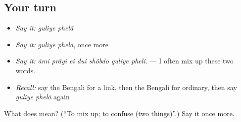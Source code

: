 \subsection*{Your turn}
\begin{itemize}
\raggedright
  \item \emph{Say it:} \emph{guliye phelā}
  \item \emph{Say it:} \emph{guliye phelā}, once more
  \item \emph{Say it:} \emph{āmi prāyi ei dui shôbdo guliye pheli.} — I often mix up these two words.
  \item \emph{Recall:} say the Bengali for a link, then the Bengali for ordinary, then say \emph{guliye phelā} again
\end{itemize}

\begin{tcolorbox}[breakable,colback=teal!4,colframe=teal!35!black,title={Before you move on}]
What does   mean? (\textquotedblleft{}To mix up; to confuse (two things)\textquotedblright{}.) Say it once more.
\end{tcolorbox}
